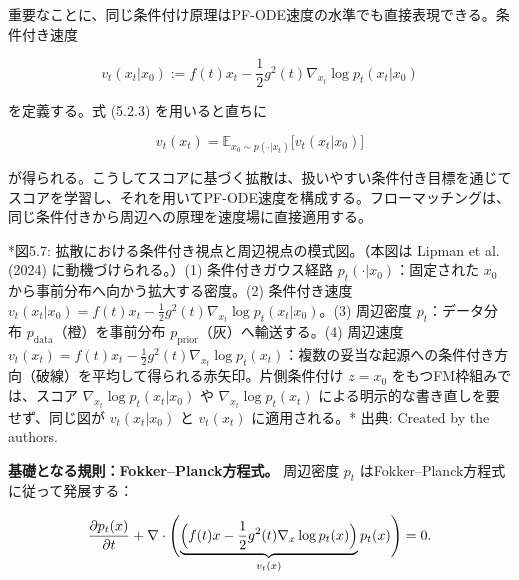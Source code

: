 重要なことに、同じ条件付け原理はPF-ODE速度の水準でも直接表現できる。条件付き速度

\[
v_t(x_t|x_0):=f(t)x_t-\frac{1}{2}g^2(t)\nabla_{x_t}\log p_t(x_t|x_0)
\]


を定義する。式 (5.2.3) を用いると直ちに

\[
v_t(x_t)=\mathbb{E}_{x_0\sim p(\cdot|x_t)}\bigl[v_t(x_t|x_0)\bigr]
\]


が得られる。こうしてスコアに基づく拡散は、扱いやすい条件付き目標を通じてスコアを学習し、それを用いてPF-ODE速度を構成する。フローマッチングは、同じ条件付きから周辺への原理を速度場に直接適用する。



*図5.7: 拡散における条件付き視点と周辺視点の模式図。（本図は Lipman et al. (2024) に動機づけられる。）(1) 条件付きガウス経路 $p_t(\cdot|x_0)$：固定された $x_0$ から事前分布へ向かう拡大する密度。(2) 条件付き速度 $v_t(x_t|x_0)=f(t)x_t-\frac{1}{2}g^2(t)\nabla_{x_t}\log p_t(x_t|x_0)$。(3) 周辺密度 $p_t$：データ分布 $p_{\mathrm{data}}$（橙）を事前分布 $p_{\mathrm{prior}}$（灰）へ輸送する。(4) 周辺速度 $v_t(x_t)=f(t)x_t-\frac{1}{2}g^2(t)\nabla_{x_t}\log p_t(x_t)$：複数の妥当な起源への条件付き方向（破線）を平均して得られる赤矢印。片側条件付け $z=x_0$ をもつFM枠組みでは、スコア $\nabla_{x_t}\log p_t(x_t|x_0)$ や $\nabla_{x_t}\log p_t(x_t)$ による明示的な書き直しを要せず、同じ図が $v_t(x_t|x_0)$ と $v_t(x_t)$ に適用される。*
出典: Created by the authors.

\textbf{基礎となる規則：Fokker–Planck方程式。} 周辺密度 $p_t$ はFokker–Planck方程式に従って発展する：

\[
\frac{\partial p_t(x)}{\partial t}+\nabla\cdot\Biggl(\underbrace{\Bigl(f(t)x-\frac{1}{2}g^2(t)\nabla_x\log p_t(x)\Bigr)}_{v_t(x)}p_t(x)\Biggr)=0.
\]


